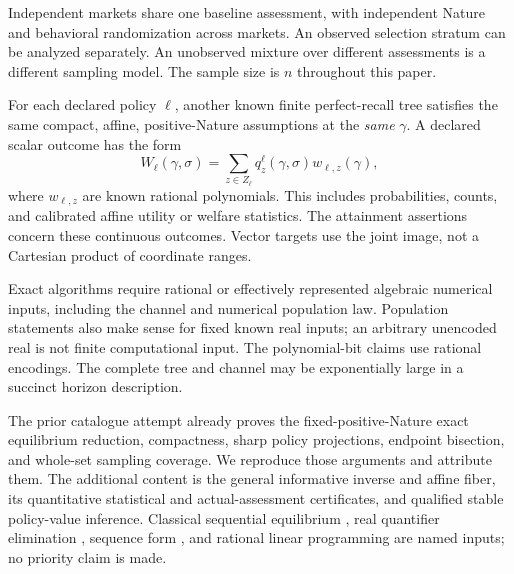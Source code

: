 \documentclass[11pt,a4paper]{article}
\numberwithin{equation}{section}
\theoremstyle{definition}
\begin{document}
Independent markets share one baseline assessment, with independent
Nature and behavioral randomization across markets. An observed
selection stratum can be analyzed separately. An unobserved mixture
over different assessments is a different sampling model.
The sample size is \(n\) throughout this paper.

For each declared policy \(\ell\), another known finite perfect-recall
tree satisfies the same compact, affine, positive-Nature assumptions
at the \emph{same} \(\gamma\). A declared scalar outcome has the form
\begin{equation}\label{eq:policyoutcome}
 W_\ell(\gamma,\sigma)
   =\sum_{z\in Z_\ell}q^\ell_z(\gamma,\sigma)w_{\ell,z}(\gamma),
\end{equation}
where \(w_{\ell,z}\) are known rational polynomials. This includes
probabilities, counts, and calibrated affine utility or welfare
statistics. The attainment assertions concern these continuous
outcomes. Vector targets use the joint image, not a Cartesian product
of coordinate ranges.

Exact algorithms require rational or effectively represented algebraic
numerical inputs, including the channel and numerical population law.
Population statements also make sense for fixed known real inputs;
an arbitrary unencoded real is not finite computational input.
The polynomial-bit claims use rational encodings. The complete tree
and channel may be exponentially large in a succinct horizon description.

The prior catalogue attempt \cite{Prior} already proves the
fixed-positive-Nature exact equilibrium reduction, compactness, sharp
policy projections, endpoint bisection, and whole-set sampling coverage.
We reproduce those arguments and attribute them. The additional content
is the general informative inverse and affine fiber, its quantitative
statistical and actual-assessment certificates, and qualified stable
policy-value inference. Classical sequential equilibrium
\cite{KW}, real quantifier elimination \cite{Basu}, sequence form
\cite{KMS}, and rational linear programming are named inputs;
no priority claim is made.
\end{document}

